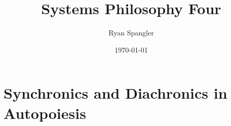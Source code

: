 \documentclass[12pt]{scrartcl}
\title{Systems Philosophy Four}
\author{Ryan Spangler}
\date{\today}
\begin{document}
\maketitle

\section{Synchronics and Diachronics in Autopoiesis}
\end{document}
